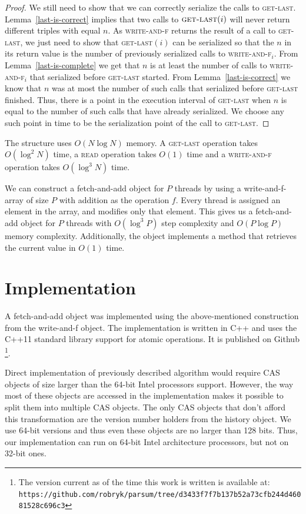 \documentclass[a4paper,11pt]{article}
\newcommand{\fn}[1]{\textsc{#1}}
\begin{document}
\begin{proof}
	We still need to show that we can correctly serialize the calls to \fn{get-last}. Lemma~\ref{last-is-correct} implies that two calls to $\fn{get-last}(i)$ will never return different triples with equal $n$. As \fn{write-and-f} returns
	the result of a call to \fn{get-last}, we just need to show that \fn{get-last}$(i)$ can be serialized so that the $n$ in its return value is the number of previously serialized calls to \fn{write-and-f$_i$}. From
	Lemma~\ref{last-is-complete} we get that $n$ is at least the number of calls to \fn{write-and-f$_i$} that serialized before \fn{get-last} started. From Lemma~\ref{last-is-correct} we know that $n$ was at most the number of such calls
	that serialized before \fn{get-last} finished. Thus, there is a point in the execution interval of \fn{get-last} when $n$ is equal to the number of such calls that have already serialized. We choose any such point in time to be the serialization
	point of the call to \fn{get-last}.
\end{proof}

The structure uses $O(N\log{}N)$ memory. A \fn{get-last} operation takes $O(\log^2 N)$ time, a \fn{read} operation takes $O(1)$ time and a \fn{write-and-f} operation takes $O(\log^3 N)$ time.

We can construct a fetch-and-add object for $P$ threads by using a write-and-f-array of size $P$ with addition as the operation $f$. Every thread is assigned an element in the array, and modifies only that element. This gives us
a fetch-and-add object for $P$ threads with $O(\log^3 P)$ step complexity and $O(P\log P)$ memory complexity. Additionally, the object implements a method that retrieves the
current value in $O(1)$ time.

\section{Implementation}
A fetch-and-add object was implemented using the above-mentioned construction from the write-and-f object. The implementation is written in C++ and uses the C++11 standard library support for atomic operations. It is published on Github \footnote{The version current as of the time this work is written is available at: \verb+https://github.com/robryk/parsum/tree/d3433f7f7b137b52a73cfb244d46081528c696c3+ }.

Direct implementation of previously described algorithm would require CAS objects of size larger than the
64-bit Intel processors support. However, the way most of these objects are accessed in the implementation makes
it possible to split them into multiple CAS objects. The only CAS objects that don't afford this transformation
are the version number holders from the history object. We use 64-bit versions and thus even these objects are
no larger than 128 bits. Thus, our implementation can run on 64-bit Intel architecture processors, but not on 32-bit ones.
\end{document}
